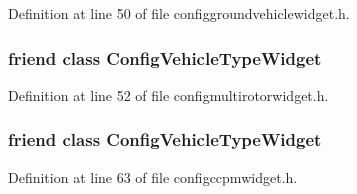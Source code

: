\-Definition at line 50 of file configgroundvehiclewidget.\-h.

\hypertarget{group___config_plugin_gaf1f904d5df6619518f3228b2d5d238d0}{
\subsubsection[{\-Config\-Vehicle\-Type\-Widget}]{\setlength{\rightskip}{0pt plus 5cm}friend class {\bf \-Config\-Vehicle\-Type\-Widget}}}\label{group___config_plugin_gaf1f904d5df6619518f3228b2d5d238d0}


\-Definition at line 52 of file configmultirotorwidget.\-h.

\hypertarget{group___config_plugin_gaf1f904d5df6619518f3228b2d5d238d0}{
\subsubsection[{\-Config\-Vehicle\-Type\-Widget}]{\setlength{\rightskip}{0pt plus 5cm}friend class {\bf \-Config\-Vehicle\-Type\-Widget}}}\label{group___config_plugin_gaf1f904d5df6619518f3228b2d5d238d0}


\-Definition at line 63 of file configccpmwidget.\-h.

